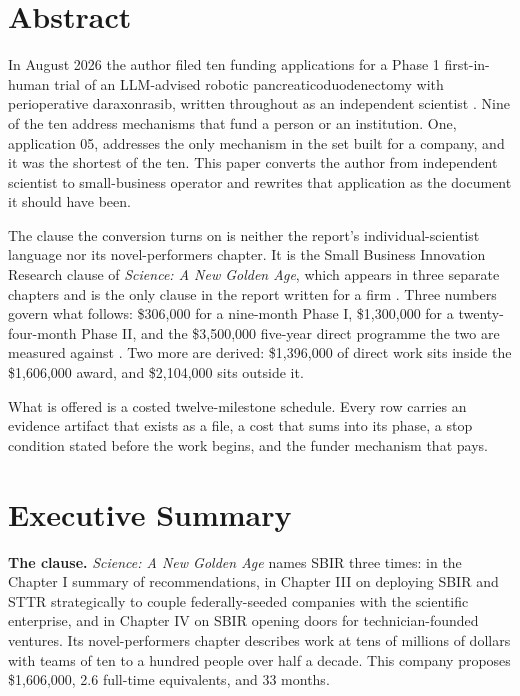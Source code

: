 \section*{Abstract}

In August 2026 the author filed ten funding applications for a Phase 1
first-in-human trial of an LLM-advised robotic pancreaticoduodenectomy with
perioperative daraxonrasib, written throughout as an independent scientist
\cite{tenapps2026}. Nine of the ten address mechanisms that fund a person or an
institution. One, application 05, addresses the only mechanism in the set built
for a company, and it was the shortest of the ten. This paper converts the
author from independent scientist to small-business operator and rewrites that
application as the document it should have been.

The clause the conversion turns on is neither the report's individual-scientist
language nor its novel-performers chapter. It is the Small Business Innovation
Research clause of \emph{Science: A New Golden Age}, which appears in three
separate chapters and is the only clause in the report written for a firm
\cite{kratsios2026sciencegoldenage}. Three numbers govern what follows:
\$306,000 for a nine-month Phase I, \$1,300,000 for a twenty-four-month Phase
II, and the \$3,500,000 five-year direct programme the two are measured against
\cite{fundapp2}. Two more are derived: \$1,396,000 of direct work sits inside
the \$1,606,000 award, and \$2,104,000 sits outside it.

What is offered is a costed twelve-milestone schedule. Every row carries an
evidence artifact that exists as a file, a cost that sums into its phase, a stop
condition stated before the work begins, and the funder mechanism that pays.

\section*{Executive Summary}

\textbf{The clause.} \emph{Science: A New Golden Age} names SBIR three times: in
the Chapter I summary of recommendations, in Chapter III on deploying SBIR and
STTR strategically to couple federally-seeded companies with the scientific
enterprise, and in Chapter IV on SBIR opening doors for technician-founded
ventures. Its novel-performers chapter describes work at tens of millions of
dollars with teams of ten to a hundred people over half a decade. This company
proposes \$1,606,000, 2.6 full-time equivalents, and 33 months.

